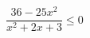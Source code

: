 \begin{ex}[type=inequality]
	\begin{condition}
		$\dfrac{36 - 25x^2}{x^2 + 2x + 3}\leqslant0  $
	\end{condition}
	\answer{$(-\infty;1,2]\cup[1,2;+\infty)  $}
\end{ex}